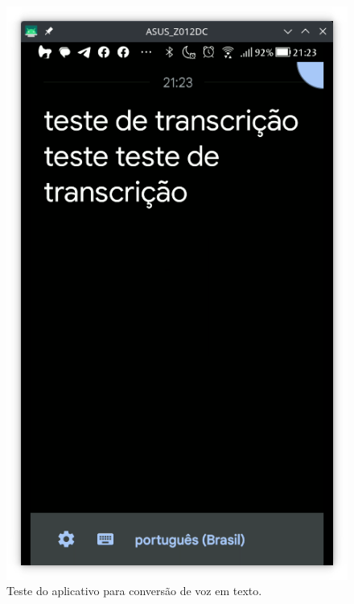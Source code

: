 \documentclass[
  12pt,       %
  openright,      %
  twoside,      %
  a4paper,      %
  english,      %
  french,       %
  spanish,      %
  brazil        %
  ]{abntex2}
\begin{document}
\begin{figure}[!htb]
\begin{minipage}{0.29\textwidth}
    \includegraphics[width=\linewidth]{android_3.png}
    \caption{Teste do aplicativo para conversão de voz em texto.}
    \label{fig:imagem3}
  \end{minipage}\hfill
  \begin{minipage}{0.29\textwidth}
    \centering

\end{minipage}
\end{figure}
\end{document}
